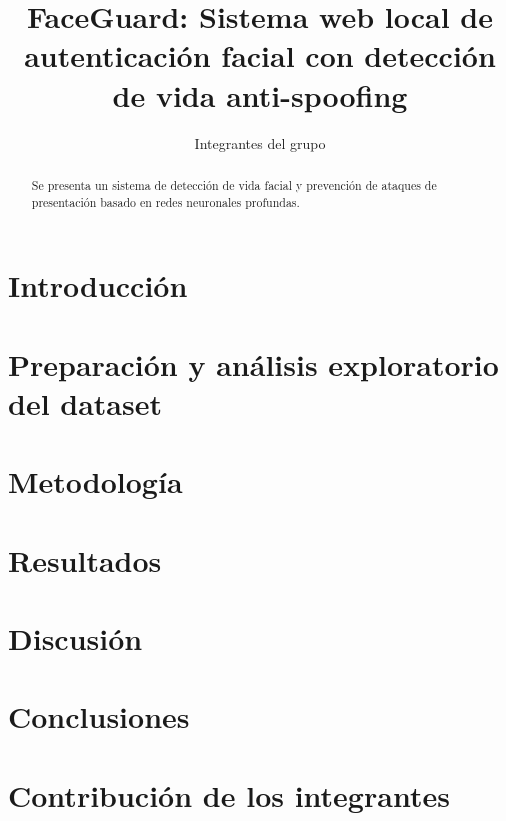 \documentclass[conference]{IEEEtran}
\title{FaceGuard: Sistema web local de autenticación facial con detección de vida anti-spoofing}
\author{Integrantes del grupo}
\begin{document}
\maketitle
\begin{abstract}
Se presenta un sistema de detección de vida facial y prevención de ataques de presentación basado en redes neuronales profundas.
\end{abstract}
\section{Introducción}
\section{Preparación y análisis exploratorio del dataset}
\section{Metodología}
\section{Resultados}
\section{Discusión}
\section{Conclusiones}
\section{Contribución de los integrantes}


\end{document}
